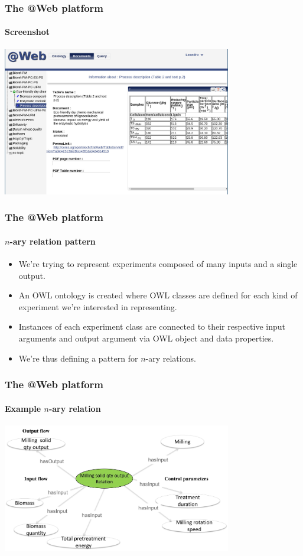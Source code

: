 \documentclass{beamer}
\makeatletter
\newcommand{\atweb}{\textbf{@Web}\xspace}
\makeatother
\begin{document}
\begin{frame}
  \frametitle{The \atweb platform}
  \framesubtitle{Screenshot}

  \begin{center}
    \includegraphics[width=10cm]{atweb-screenshot-document.jpg}
  \end{center}
\end{frame}

\begin{frame}
  \frametitle{The \atweb platform}
  \framesubtitle{$n$-ary relation pattern}

  \begin{itemize}
    \item We're trying to represent experiments composed of many inputs and a
      single output.

    \item An OWL ontology is created where OWL classes are defined for each
      kind of experiment we're interested in representing.

    \item Instances of each experiment class are connected to their respective
      input arguments and output argument via OWL object and data properties.

    \item We're thus defining a pattern for $n$-ary relations.
  \end{itemize}
\end{frame}

\begin{frame}
  \frametitle{The \atweb platform}
  \framesubtitle{Example $n$-ary relation}

  \begin{center}
    \includegraphics[width=10cm]{relation.jpg}
  \end{center}
\end{frame}
\end{document}
